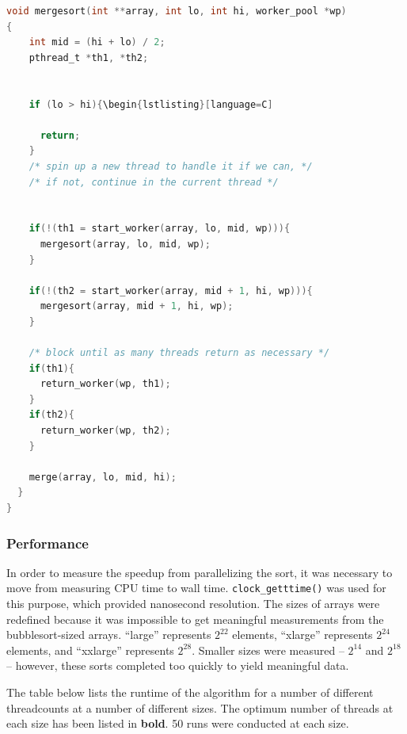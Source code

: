\documentclass{article}
\begin{document}
\begin{lstlisting}[language=C]
void mergesort(int **array, int lo, int hi, worker_pool *wp)
{
	int mid = (hi + lo) / 2;
	pthread_t *th1, *th2;


	if (lo > hi){\begin{lstlisting}[language=C]

      return;
    }
    /* spin up a new thread to handle it if we can, */
    /* if not, continue in the current thread */
		
    
    if(!(th1 = start_worker(array, lo, mid, wp))){
      mergesort(array, lo, mid, wp);
    }

    if(!(th2 = start_worker(array, mid + 1, hi, wp))){
      mergesort(array, mid + 1, hi, wp);
    }

    /* block until as many threads return as necessary */
    if(th1){
      return_worker(wp, th1);
    }
    if(th2){
      return_worker(wp, th2);
    }
    
    merge(array, lo, mid, hi);
  }
}
\end{lstlisting}

\subsubsection{Performance}

In order to measure the speedup from parallelizing the sort, it was
necessary to move from measuring CPU time to wall
time. \texttt{clock\_getttime()} was used for this purpose, which
provided nanosecond resolution. The sizes of arrays were redefined
because it was impossible to get meaningful measurements from the
bubblesort-sized arrays. ``large'' represents $2^{22}$ elements,
``xlarge'' represents $2^{24}$ elements, and ``xxlarge'' represents
$2^{28}$. Smaller sizes were measured -- $2^{14}$ and $2^{18}$ --
however, these sorts completed too quickly to yield meaningful data.

The table below lists the runtime of the algorithm for a number of
different threadcounts at a number of different sizes. The optimum
number of threads at each size has been listed in \textbf{bold}. 50
runs were conducted at each size. 
\end{document}
